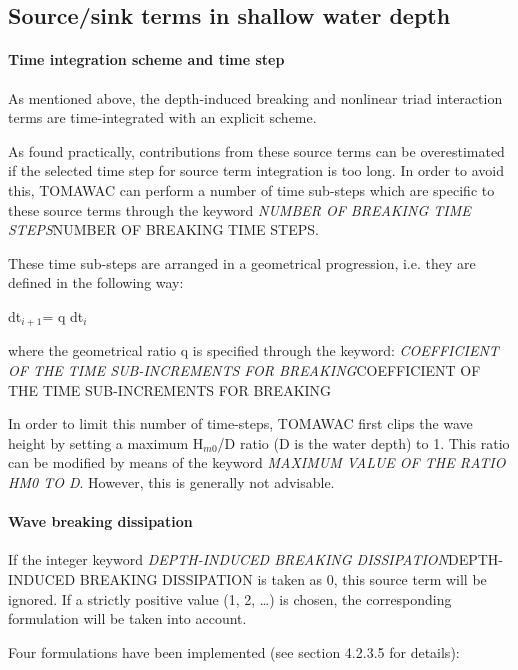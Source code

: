 \subsection{ Source/sink terms in shallow water depth}


\paragraph{ Time integration scheme and time step}

 As mentioned above, the depth-induced breaking and nonlinear triad interaction terms are time-integrated with an explicit scheme.

 As found practically, contributions from these source terms can be overestimated if the selected time step for source term integration is too long. In order to avoid this, TOMAWAC can perform a number of time sub-steps which are specific to these source terms through the keyword \textit{NUMBER OF BREAKING TIME STEPS}NUMBER OF BREAKING TIME STEPS.

 These time sub-steps are arranged in a geometrical progression, i.e. they are defined in the following way:

dt${}_{i+1 }$= q dt${}_{i}$

 where the geometrical ratio q is specified through the keyword: \textit{COEFFICIENT OF THE TIME SUB-INCREMENTS FOR BREAKING}COEFFICIENT OF THE TIME SUB-INCREMENTS FOR BREAKING

 In order to limit this number of time-steps, TOMAWAC first clips the wave height by setting a maximum H${}_{m0}$/D ratio (D is the water depth) to 1. This ratio can be modified by means of the keyword \textit{MAXIMUM VALUE OF THE RATIO HM0 TO D}. However, this is generally not advisable.


\paragraph{ Wave breaking dissipation}

 If the integer keyword \textit{DEPTH-INDUCED BREAKING DISSIPATION}DEPTH-INDUCED BREAKING DISSIPATION\textit{ }is taken as 0, this source term will be ignored. If a strictly positive value (1, 2, \dots ) is chosen, the corresponding formulation will be taken into account.

 Four formulations have been implemented (see section 4.2.3.5 for details):



 \textbf{}


